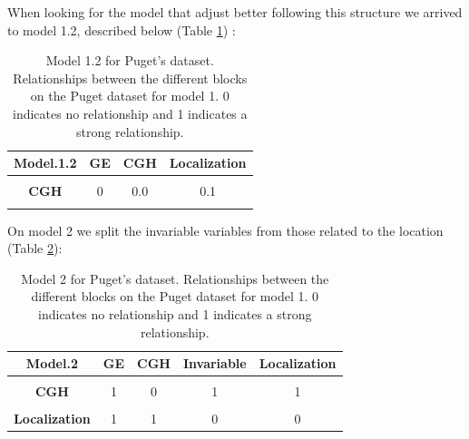 \documentclass[
  a4paper,
]{book}
\begin{document}
When looking for the model that adjust better following this structure we arrived to model 1.2, described below (Table \ref{tab:puget-model1-2}) :

\begin{table}[H]

\caption[Model 1.2 for Puget's dataset.]{\label{tab:puget-model1-2}Model 1.2 for Puget's dataset. Relationships between the different blocks on the Puget dataset for model 1. 0 indicates no relationship and 1 indicates a strong relationship.}
\centering
\begin{tabular}[t]{|>{}c|c|c|>{}c|}
\hline
\textbf{Model.1.2} & \textbf{GE} & \textbf{CGH} & \textbf{Localization}\\
\hline
\textbf{\cellcolor{gray!6}{GE}} & \cellcolor{gray!6}{0} & \cellcolor{gray!6}{0.0} & \cellcolor{gray!6}{1.0}\\
\hline
\textbf{CGH} & 0 & 0.0 & 0.1\\
\hline
\textbf{\cellcolor{gray!6}{Localization}} & \cellcolor{gray!6}{1} & \cellcolor{gray!6}{0.1} & \cellcolor{gray!6}{0.0}\\
\hline
\end{tabular}
\end{table}

On model 2 we split the invariable variables from those related to the location (Table \ref{tab:puget-model2}):

\begin{table}[H]

\caption[Model 2 for Puget's dataset.]{\label{tab:puget-model2}Model 2 for Puget's dataset. Relationships between the different blocks on the Puget dataset for model 1. 0 indicates no relationship and 1 indicates a strong relationship.}
\centering
\begin{tabular}[t]{|>{}c|c|c|c|>{}c|}
\hline
\textbf{Model.2} & \textbf{GE} & \textbf{CGH} & \textbf{Invariable} & \textbf{Localization}\\
\hline
\textbf{\cellcolor{gray!6}{GE}} & \cellcolor{gray!6}{0} & \cellcolor{gray!6}{1} & \cellcolor{gray!6}{1} & \cellcolor{gray!6}{1}\\
\hline
\textbf{CGH} & 1 & 0 & 1 & 1\\
\hline
\textbf{\cellcolor{gray!6}{Invariable}} & \cellcolor{gray!6}{1} & \cellcolor{gray!6}{1} & \cellcolor{gray!6}{0} & \cellcolor{gray!6}{0}\\
\hline
\textbf{Localization} & 1 & 1 & 0 & 0\\
\hline
\end{tabular}
\end{table}
\end{document}
